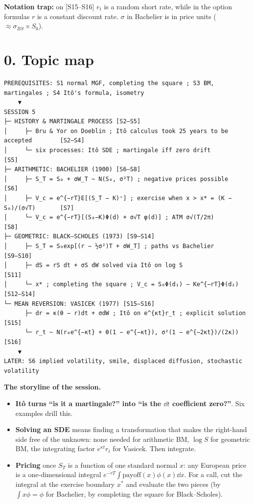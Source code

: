 \documentclass[10pt]{article}
\begin{document}
\textbf{Notation trap:} on [S15--S16] $r_t$ is a random short rate, while in the option formulas $r$ is a constant discount rate. $\sigma$ in Bachelier is in price units ($\approx\sigma_{BS}\times S_0$).

\section*{0. Topic map}
\begin{lstlisting}
PREREQUISITES: S1 normal MGF, completing the square ; S3 BM, martingales ; S4 Itô's formula, isometry
    ▼
SESSION 5
├─ HISTORY & MARTINGALE PROCESS [S2–S5]
│     ├─ Bru & Yor on Doeblin ; Itô calculus took 25 years to be accepted        [S2–S4]
│     └─ six processes: Itô SDE ; martingale iff zero drift                      [S5]
├─ ARITHMETIC: BACHELIER (1900) [S6–S8]
│     ├─ S_T = S₀ + σW_T ~ N(S₀, σ²T) ; negative prices possible                [S6]
│     ├─ V_c = e^{−rT}E[(S_T − K)⁺] ; exercise when x > x* = (K − S₀)/(σ√T)       [S7]
│     └─ V_c = e^{−rT}[(S₀−K)Φ(d) + σ√T φ(d)] ; ATM σ√(T/2π)                     [S8]
├─ GEOMETRIC: BLACK–SCHOLES (1973) [S9–S14]
│     ├─ S_T = S₀exp[(r − ½σ²)T + σW_T] ; paths vs Bachelier                     [S9–S10]
│     ├─ dS = rS dt + σS dW solved via Itô on log S                              [S11]
│     └─ x* ; completing the square ; V_c = S₀Φ(d₁) − Ke^{−rT}Φ(d₂)              [S12–S14]
└─ MEAN REVERSION: VASICEK (1977) [S15–S16]
      ├─ dr = κ(θ − r)dt + σdW ; Itô on e^{κt}r_t ; explicit solution            [S15]
      └─ r_t ~ N(r₀e^{−κt} + θ(1 − e^{−κt}), σ²(1 − e^{−2κt})/(2κ))              [S16]
    ▼
LATER: S6 implied volatility, smile, displaced diffusion, stochastic volatility
\end{lstlisting}
\textbf{The storyline of the session.}
\begin{itemize}
\item \textbf{It\^o turns ``is it a martingale?'' into ``is the $\dd t$ coefficient zero?''}. Six examples drill this.
\item \textbf{Solving an SDE} means finding a transformation that makes the right-hand side free of the unknown: none needed for arithmetic BM, $\log S$ for geometric BM, the integrating factor $e^{\kappa t}r_t$ for Vasicek. Then integrate.
\item \textbf{Pricing} once $S_T$ is a function of one standard normal $x$: any European price is a one-dimensional integral $e^{-rT}\int\text{payoff}(x)\phi(x)\dd x$. For a call, cut the integral at the exercise boundary $x^*$ and evaluate the two pieces (by $\int x\phi=\phi$ for Bachelier, by completing the square for Black--Scholes).
\end{itemize}
\end{document}
